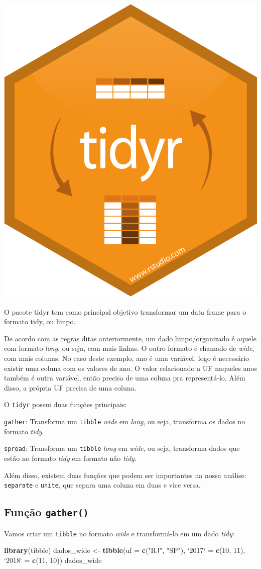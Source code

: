 \documentclass[]{book}
\newenvironment{Shaded}{\begin{snugshade}}{\end{snugshade}}
\newcommand{\DataTypeTok}[1]{\textcolor[rgb]{0.13,0.29,0.53}{#1}}
\newcommand{\DecValTok}[1]{\textcolor[rgb]{0.00,0.00,0.81}{#1}}
\newcommand{\KeywordTok}[1]{\textcolor[rgb]{0.13,0.29,0.53}{\textbf{#1}}}
\newcommand{\NormalTok}[1]{#1}
\newcommand{\StringTok}[1]{\textcolor[rgb]{0.31,0.60,0.02}{#1}}
\begin{document}
\begin{center}\includegraphics[width=0.25\linewidth]{imagens/tidyr} \end{center}

O pacote tidyr tem como principal objetivo transformar um data frame para o formato tidy, ou limpo.

De acordo com as regras ditas anteriormente, um dado limpo/organizado é aquele com formato \emph{long}, ou seja, com mais linhas. O outro formato é chamado de \emph{wide}, com mais colunas. No caso deste exemplo, ano é uma variável, logo é necessário existir uma coluna com os valores de ano. O valor relacionado a UF naqueles anos também é outra variável, então precisa de uma coluna pra representá-lo. Além disso, a própria UF precisa de uma coluna.

O \texttt{tidyr} possui duas funções principais:

\texttt{gather}: Transforma um \texttt{tibble} \emph{wide} em \emph{long}, ou seja, transforma os dados no formato \emph{tidy}.

\texttt{spread}: Transforma um \texttt{tibble} \emph{long} em \emph{wide}, ou seja, transforma dados que estão no formato \emph{tidy} em formato não \emph{tidy}.

Além disso, existem duas funções que podem ser importantes na nossa análise: \texttt{separate} e \texttt{unite}, que separa uma coluna em duas e vice versa.

\hypertarget{funcao-gather}{%
\subsection{\texorpdfstring{Função \texttt{gather()}}{Função gather()}}\label{funcao-gather}}

Vamos criar um \texttt{tibble} no formato \emph{wide} e transformá-lo em um dado \emph{tidy}:

\begin{Shaded}
\begin{Highlighting}[]
\KeywordTok{library}\NormalTok{(tibble)}
\NormalTok{dados_wide <-}\StringTok{ }\KeywordTok{tibble}\NormalTok{(}\DataTypeTok{uf =} \KeywordTok{c}\NormalTok{(}\StringTok{"RJ"}\NormalTok{, }\StringTok{"SP"}\NormalTok{), }\StringTok{`}\DataTypeTok{2017}\StringTok{`}\NormalTok{ =}\StringTok{ }\KeywordTok{c}\NormalTok{(}\DecValTok{10}\NormalTok{, }\DecValTok{11}\NormalTok{), }\StringTok{`}\DataTypeTok{2018}\StringTok{`}\NormalTok{ =}\StringTok{ }\KeywordTok{c}\NormalTok{(}\DecValTok{11}\NormalTok{, }\DecValTok{10}\NormalTok{))}
\NormalTok{dados_wide}
\end{Highlighting}
\end{Shaded}
\end{document}
